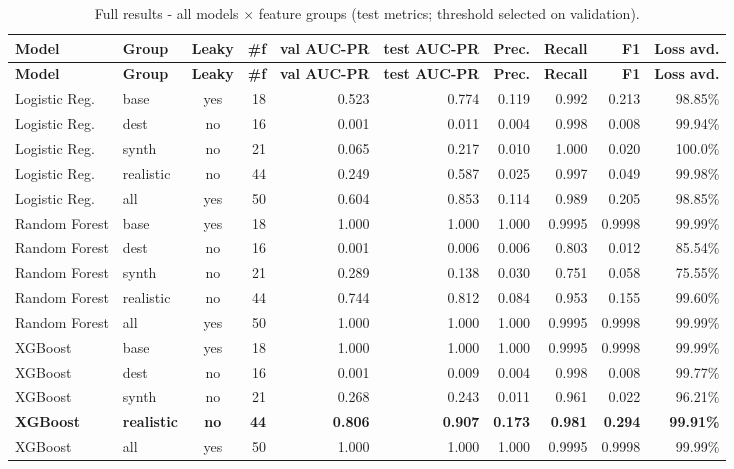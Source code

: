 \documentclass[11pt,a4paper]{report}
\begin{document}
{\footnotesize
\setlength{\tabcolsep}{4.5pt}
\begin{longtable}{@{}l l c r rr rrr r@{}}
\caption{Full results - all models $\times$ feature groups (test metrics; threshold selected
on validation).}\label{tab:fullresults}\\
\toprule
\textbf{Model} & \textbf{Group} & \textbf{Leaky} & \textbf{\#f} & \textbf{val AUC-PR} & \textbf{test AUC-PR} & \textbf{Prec.} & \textbf{Recall} & \textbf{F1} & \textbf{Loss avd.}\\
\midrule
\endfirsthead
\toprule
\textbf{Model} & \textbf{Group} & \textbf{Leaky} & \textbf{\#f} & \textbf{val AUC-PR} & \textbf{test AUC-PR} & \textbf{Prec.} & \textbf{Recall} & \textbf{F1} & \textbf{Loss avd.}\\
\midrule
\endhead
\bottomrule
\endfoot
Logistic Reg. & base & yes & 18 & 0.523 & 0.774 & 0.119 & 0.992 & 0.213 & 98.85\%\\
Logistic Reg. & dest & no & 16 & 0.001 & 0.011 & 0.004 & 0.998 & 0.008 & 99.94\%\\
Logistic Reg. & synth & no & 21 & 0.065 & 0.217 & 0.010 & 1.000 & 0.020 & 100.0\%\\
Logistic Reg. & realistic & no & 44 & 0.249 & 0.587 & 0.025 & 0.997 & 0.049 & 99.98\%\\
Logistic Reg. & all & yes & 50 & 0.604 & 0.853 & 0.114 & 0.989 & 0.205 & 98.85\%\\
\midrule
Random Forest & base & yes & 18 & 1.000 & 1.000 & 1.000 & 0.9995 & 0.9998 & 99.99\%\\
Random Forest & dest & no & 16 & 0.001 & 0.006 & 0.006 & 0.803 & 0.012 & 85.54\%\\
Random Forest & synth & no & 21 & 0.289 & 0.138 & 0.030 & 0.751 & 0.058 & 75.55\%\\
Random Forest & realistic & no & 44 & 0.744 & 0.812 & 0.084 & 0.953 & 0.155 & 99.60\%\\
Random Forest & all & yes & 50 & 1.000 & 1.000 & 1.000 & 0.9995 & 0.9998 & 99.99\%\\
\midrule
XGBoost & base & yes & 18 & 1.000 & 1.000 & 1.000 & 0.9995 & 0.9998 & 99.99\%\\
XGBoost & dest & no & 16 & 0.001 & 0.009 & 0.004 & 0.998 & 0.008 & 99.77\%\\
XGBoost & synth & no & 21 & 0.268 & 0.243 & 0.011 & 0.961 & 0.022 & 96.21\%\\
\textbf{XGBoost} & \textbf{realistic} & \textbf{no} & \textbf{44} & \textbf{0.806} & \textbf{0.907} & \textbf{0.173} & \textbf{0.981} & \textbf{0.294} & \textbf{99.91\%}\\
XGBoost & all & yes & 50 & 1.000 & 1.000 & 1.000 & 0.9995 & 0.9998 & 99.99\%\\
\end{longtable}}
\end{document}
